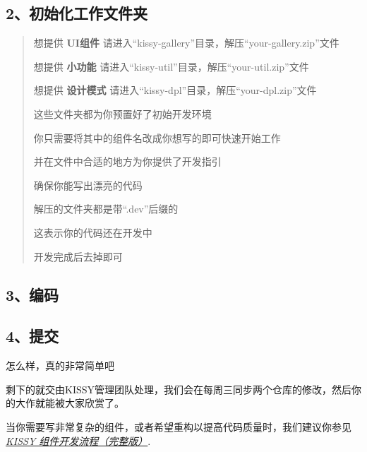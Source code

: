 \documentclass[letterpaper,10pt,english]{sphinxmanual}
\begin{document}
\subsection{2、初始化工作文件夹}
\label{workflow/workflow-simple:id2}\begin{quote}

\begin{DUlineblock}{0em}
\item[] 想提供 \textbf{UI组件} 请进入“kissy-gallery”目录，解压“your-gallery.zip”文件
\item[] 想提供 \textbf{小功能} 请进入“kissy-util”目录，解压“your-util.zip”文件
\item[] 想提供 \textbf{设计模式} 请进入“kissy-dpl”目录，解压“your-dpl.zip”文件
\end{DUlineblock}

\begin{DUlineblock}{0em}
\item[] 这些文件夹都为你预置好了初始开发环境
\item[] 你只需要将其中的组件名改成你想写的即可快速开始工作
\item[] 并在文件中合适的地方为你提供了开发指引
\item[] 确保你能写出漂亮的代码
\end{DUlineblock}

\begin{DUlineblock}{0em}
\item[] 解压的文件夹都是带“.dev”后缀的
\item[] 这表示你的代码还在开发中
\item[] 开发完成后去掉即可
\end{DUlineblock}
\end{quote}


\subsection{3、编码}
\label{workflow/workflow-simple:id3}

\subsection{4、提交}
\label{workflow/workflow-simple:id4}
\begin{DUlineblock}{0em}
\item[] 怎么样，真的非常简单吧
\item[] 剩下的就交由KISSY管理团队处理，我们会在每周三同步两个仓库的修改，然后你的大作就能被大家欣赏了。
\item[] 当你需要写非常复杂的组件，或者希望重构以提高代码质量时，我们建议你参见 {\hyperref[workflow/workflow-full:workflow-full]{\emph{KISSY 组件开发流程（完整版）}}}.
\end{DUlineblock}
\end{document}
